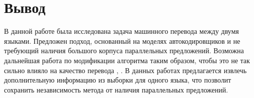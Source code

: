 \documentclass[12pt,twoside]{article}
\begin{document}
\section{Вывод}

В данной работе была исследована задача машинного перевода между двумя языками. Предложен подход, основанный на моделях автокодировщиков и не требующий наличия большого корпуса параллельных предложений. Возможна дальнейшая работа по модификации алгоритма таким образом, чтобы это не так сильно влияло на качество перевода \cite{irvine2016end}, \cite{klementiev2012toward}. В данных работах предлагается извлечь дополнительную информацию из выборки для одного языка, что позволит сохранить независимость метода от наличия параллельных предложений.

\clearpage



\end{document}

